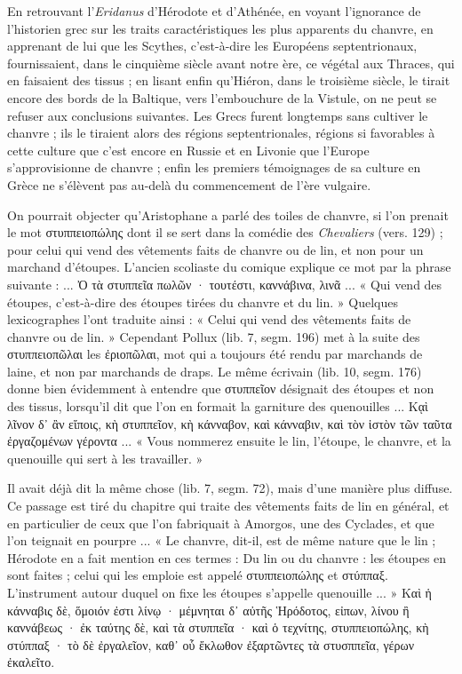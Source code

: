 \documentclass[a4paper, 11pt, oneside, polutonikogreek, french]{article}
\begin{document}
En retrouvant l'\emph{Eridanus} d'Hérodote et d'Athénée, en voyant l'ignorance de l'historien grec sur les traits caractéristiques les plus apparents du chanvre, en apprenant de lui que les Scythes, c'est-à-dire les Européens septentrionaux, fournissaient, dans le cinquième siècle avant notre ère, ce végétal aux Thraces, qui en faisaient des tissus ; en lisant enfin qu'Hiéron, dans le troisième siècle, le tirait encore des bords de la Baltique, vers l'embouchure de la Vistule, on ne peut se refuser aux conclusions suivantes. Les Grecs furent longtemps sans cultiver le chanvre ; ils le tiraient alors des régions septentrionales, régions si favorables à cette culture que c'est encore en Russie et en Livonie que l'Europe s'approvisionne de chanvre ; enfin les premiers témoignages de sa culture en Grèce ne s'élèvent pas au-delà du commencement de l'ère vulgaire.

On pourrait objecter qu'Aristophane a parlé des toiles de chanvre, si l'on prenait le mot στυππειοπώλης dont il se sert dans la comédie des \emph{Chevaliers} (vers. 129) ; pour celui qui vend des vêtements faits de chanvre ou de lin, et non pour un marchand d'étoupes. L'ancien scoliaste du comique explique ce mot par la phrase suivante : ... Ὀ τὰ στυππεῖα πωλῶν · τουτέστι, καννάβινα, λινᾶ ... « Qui vend des étoupes, c'est-à-dire des étoupes tirées du chanvre et du lin. » Quelques lexicographes l'ont traduite ainsi : « Celui qui vend des vêtements faits de chanvre ou de lin. » Cependant Pollux (lib. 7, segm. 196) met à la suite des στυππειοπῶλαι les ἐριοπῶλαι, mot qui a toujours été rendu par marchands de laine, et non par marchands de draps. Le même écrivain (lib. 10, segm. 176) donne bien évidemment à entendre que στυππεῖον désignait des étoupes et non des tissus, lorsqu'il dit que l'on en formait la garniture des quenouilles ... Κᾳὶ λῖνον δ᾽ ἂν εἴποις, κὴ στυππεῖον, κὴ κάνναβον, καὶ κάνναβιν, καὶ τὸν ἱστὸν τῶν ταῦτα ἐργαζομένων γέροντα ... « Vous nommerez ensuite le lin, l'étoupe, le chanvre, et la quenouille qui sert à les travailler. »

Il avait déjà dit la même chose (lib. 7, segm. 72), mais d'une manière plus diffuse. Ce passage est tiré du chapitre qui traite des vêtements faits de lin en général, et en particulier de ceux que l'on fabriquait à Amorgos, une des Cyclades, et que l'on teignait en pourpre ... « Le chanvre, dit-il, est de même nature que le lin ; Hérodote en a fait mention en ces termes : Du lin ou du chanvre : les étoupes en sont faites ; celui qui les emploie est appelé στυππειοπώλης et στύππαξ. L'instrument autour duquel on fixe les étoupes s'appelle quenouille ... » Καὶ ἡ κάνναβις δὲ, ὅμοιόν ἐστι λίνῳ · μέμνηται δ᾽ αὐτῆς Ἡρόδοτος, εἰπων, λίνου ἢ καννάβεως · ἐκ ταύτης δὲ, καὶ τὰ στυππεῖα · καὶ ὁ τεχνίτης, στυππειοπώλης, κὴ στύππαξ · τὸ δὲ ἐργαλεῖον, καθ᾽ οὗ ἔκλωθον ἐξαρτῶντες τὰ στυσππεῖα, γέρων ἐκαλεῖτο.
\end{document}

